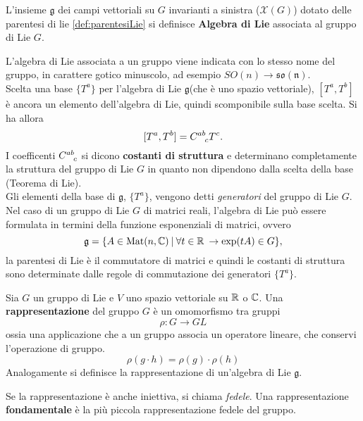 \begin{definition}\label{}
   L'insieme $\mathfrak{g}$ dei campi vettoriali su $G$ invarianti a sinistra
   ($\mathcal{X}(G)$)
   dotato delle parentesi di lie \ref{def:parentesiLie} si definisce
   \textbf{Algebra di Lie} associata al gruppo di Lie $G$.
\end{definition}
L'algebra di Lie associata a un gruppo viene indicata con lo stesso nome del gruppo,
in carattere gotico minuscolo, ad esempio $SO(n)\to \mathfrak{so(n)}$.\\

Scelta una base  $\{T^a\}$ per l'algebra di Lie $\mathfrak{g}$(che è uno spazio
vettoriale), $[T^a,T^b]$ è ancora un elemento dell'algebra di Lie,
quindi scomponibile sulla base scelta. Si ha allora
$$
    [T^a,T^b] = C^{ab}_{\hphantom{ab}c} T^c .
$$
I coefficenti $ C^{ab}_{\hphantom{ab}c}$ si dicono \textbf{costanti di struttura}
e determinano completamente la struttura del gruppo di Lie $G$ in quanto non
dipendono dalla scelta della base (Teorema di Lie).\\
Gli elementi della base di $\mathfrak{g}$, $\{T^a\}$, vengono detti
\emph{generatori} del gruppo di Lie $G$.\\
Nel caso di un gruppo di Lie $G$ di matrici reali, l'algebra di Lie può essere
formulata in termini della funzione esponenziali di matrici, ovvero
$$
\mathfrak{g} = \{ A \in \mathrm{Mat}(n,\mathbb{C}) \: | \:
\forall t \in \mathbb{R} \:\to \exp (tA) \in G \},
$$
la parentesi di Lie è il commutatore di matrici e quindi le costanti di struttura
sono determinate dalle regole di commutazione dei generatori $\{T^a\}$.\\

\begin{definition}
   Sia $G$ un gruppo di Lie e $V$ uno spazio vettoriale su $\mathbb{R}$ o $\mathbb{C}$. Una
   \textbf{rappresentazione} del gruppo $G$ è un omomorfismo tra gruppi
   $$ \rho : G \to GL $$
   ossia una applicazione che a un gruppo associa un operatore lineare, che conservi
   l'operazione di gruppo.
   $$ \rho(g \cdot h) = \rho(g) \cdot \rho(h) $$
   Analogamente si definisce la rappresentazione di un'algebra di Lie $\mathfrak{g}$.
\end{definition}
Se la rappresentazione è anche iniettiva, si chiama \emph{fedele}. Una rappresentazione
\textbf{fondamentale} è la più piccola rappresentazione fedele del gruppo.

